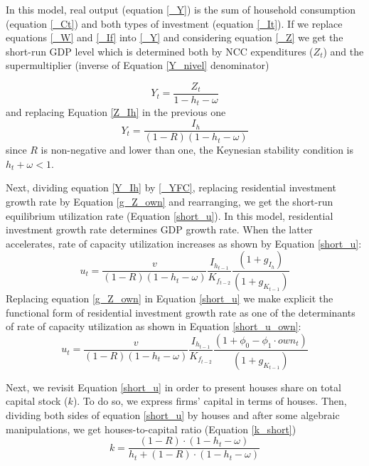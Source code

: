\documentclass[11pt]{article}
\begin{document}
In this model, real output (equation \ref{_Y}) is the sum of household consumption (equation \ref{_Ct}) and both types of investment (equation \ref{_It}). 
If we replace equations \ref{_W} and  \ref{_If} into \ref{_Y} and considering equation \ref{_Z} we get the short-run GDP level which is determined both by NCC expenditures (\(Z_t\)) and the supermultiplier (inverse of Equation \ref{Y_nivel} denominator)

\begin{equation}
\label{Y_nivel}
Y_t = \frac{Z_t}{1 - h_t - \omega}
\end{equation}
and replacing Equation \ref{Z_Ih} in the previous one
\begin{equation}
\label{Y_Ih}
Y_t = \frac{I_h}{(1-R)(1 - h_t - \omega)}
\end{equation}
since \(R\) is non-negative and lower than one, the Keynesian stability condition is \(h_{t} + \omega < 1\).

Next, dividing equation \ref{Y_Ih} by \ref{_YFC},  replacing residential investment growth rate by Equation \ref{g_Z_own}  and rearranging, we get the short-run equilibrium utilization rate (Equation \ref{short_u}).
In this model, residential investment growth rate determines GDP growth rate.
When the latter accelerates, rate of capacity utilization increases as shown by Equation \ref{short_u}:
\begin{equation}
\label{short_u}
u_t = \frac{v}{(1-R)(1-h_t - \omega)}\frac{I_{h_{t-1}}}{K_{f_{t-2}}}\frac{(1 + g_{I_h})}{(1+g_{K_{t-1}})}
\end{equation}
Replacing equation \ref{g_Z_own} in Equation \ref{short_u} we make explicit the functional form of residential investment growth rate as one of the determinants of rate of capacity utilization as shown in Equation \ref{short_u_own}:
\begin{equation}
\label{short_u_own}
u_t = \frac{v}{(1-R)(1-h_t - \omega)}\frac{I_{h_{t-1}}}{K_{f_{t-2}}}\frac{(1 + \phi_0 - \phi_1\cdot own_t)}{(1+g_{K_{t-1}})}
\end{equation}

Next, we revisit Equation \ref{short_u} in order to present houses share on total capital stock (\(k\)).
To do so, we express firms' capital in terms of houses. 
Then, dividing both sides of equation \ref{short_u} by houses and after some algebraic manipulations, we get houses-to-capital ratio (Equation \ref{k_short})
\begin{equation}
\label{k_short}
k = \frac{(1-R)\cdot (1-h_t - \omega)}{h_t + (1-R)\cdot (1-h_t - \omega)}
\end{equation}
\end{document}
